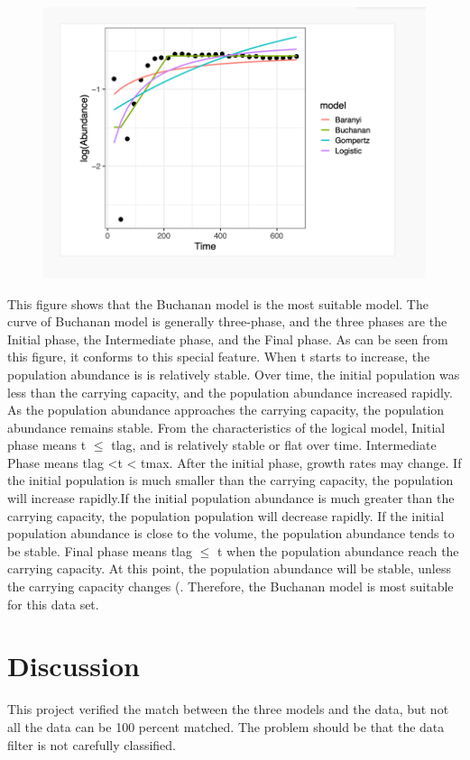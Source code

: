 \documentclass[11pt,a4 paper,title page]{article}
\begin{document}
\begin{figure}[H]
\centering
\includegraphics[width=.8\textwidth]{../picture/figure17.png}
\end{figure}
  \hfill\break
This figure shows that the Buchanan model is the most suitable model. The curve of Buchanan model is generally three-phase, and the three phases are the Initial phase, the Intermediate phase, and the Final phase. As can be seen from this figure, it conforms to this special feature. When t starts to increase, the population abundance is is relatively stable. Over time, the initial population was less than the carrying capacity, and the population abundance increased rapidly. As the population abundance approaches the carrying capacity, the population abundance remains stable.
From the characteristics of the logical model, Initial phase means t $\leq$ tlag, and is relatively stable or flat over time. Intermediate Phase means tlag <t < tmax. After the initial phase, growth rates may change. If the initial population is much smaller than the carrying capacity, the population will increase rapidly.If the initial population abundance is much greater than the carrying capacity, the population population will decrease rapidly. If the initial population abundance is close to the volume, the population abundance tends to be stable. Final phase means tlag $\leq$ t when the population abundance reach the carrying capacity. At this point, the population abundance will be stable, unless the carrying capacity changes (\cite{lopez2004statistical}. Therefore, the Buchanan model is most suitable for this data set.


  \section{Discussion}
This project verified the match between the three models and the data, but not all the data can be 100 percent matched. The problem should be that the data filter is not carefully classified.

  
  
\end{document}
